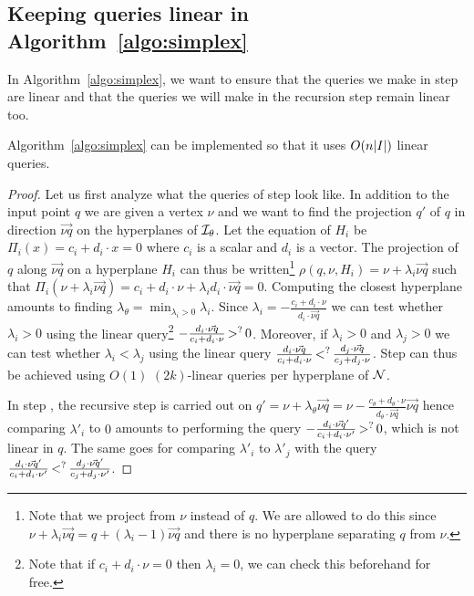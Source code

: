 \subsection{Keeping queries linear in Algorithm~\ref*{algo:simplex}}
\label{app:keeplinear}
In Algorithm~\ref{algo:simplex}, we want to ensure that the queries we make in step
 are linear and that the queries we will make in the recursion step
remain linear too.
\begin{lemma}
	Algorithm~\ref{algo:simplex} can be implemented so that it uses $O(n|{I}|)$ linear queries.
\end{lemma}%
\begin{proof}
Let us first analyze what the queries of step  look like. In addition
to the input point \(q\) we are given a vertex \(\nu\) and we want to find the
projection \(q'\) of \(q\) in direction \(\vec{\nu q}\) on the hyperplanes of
\(\mathcal{I}_{\theta}\). Let the equation of \(H_{i}\) be \(\Pi_{i}(x) =
c_{i} + d_{i}
\cdot x = 0\) where \(c_{i}\) is a scalar and \(d_{i}\) is a
vector.
The projection of \(q\) along \(\vec{\nu q}\) on a hyperplane \(H_i\) can thus
be written\footnote{Note that we project from \(\nu\) instead of \(q\). We are
allowed to do this since \(\nu + \lambda_{i} \vec{\nu q} = q + (\lambda_i - 1)
\vec{\nu q}\) and there is no hyperplane
separating \(q\) from \(\nu\).}
\(\rho(q,\nu,H_i) = \nu + \lambda_{i} \vec{\nu q}\) such that \(\Pi_{i}(\nu +
		\lambda_{i} \vec{\nu q}) = c_{i} + d_{i} \cdot \nu +
		\lambda_{i} d_{i} \cdot
\vec{\nu q} = 0\). Computing the closest hyperplane amounts to finding
\(\lambda_{\theta} = \min_{\lambda_i > 0} \lambda_i\). Since \(\lambda_i = -
\frac{c_i + d_i \cdot \nu}{d_i \cdot \vec{\nu q}}\) we can test whether
\(\lambda_i > 0\)
using the linear query\footnote{Note that if $c_i + d_i \cdot \nu = 0$ then
$\lambda_i=0$, we can check this beforehand for free.}
\(-\frac{d_i \cdot \vec{\nu q}}{c_i + d_i
\cdot \nu} \mathop{>}^{?} 0\). Moreover, if \(\lambda_i > 0\) and \(\lambda_j > 0\)
we can test whether $\lambda_i < \lambda_j$ using the linear query \(
\frac{d_i \cdot \vec{\nu q}}{c_i + d_i \cdot \nu}
\mathop{<}^{?}
\frac{d_j \cdot \vec{\nu q}}{c_j + d_j \cdot \nu}\).
Step  can thus be achieved using \(O(1)\) \((2k)\)-linear queries per
hyperplane of \(\mathcal{N}\).

In step , the
recursive step is carried out on \(q' = \nu + \lambda_{\theta} \vec{\nu q} = \nu -
\frac{c_{\theta} + d_{\theta} \cdot \nu}{d_{\theta} \cdot \vec{\nu q}}
\vec{\nu q}\) hence comparing \(\lambda'_i\) to \(0\) amounts to performing the
query \(-\frac{d_i \cdot \vec{\nu q}'}{c_i + d_i \cdot \nu'}
\mathop{>}^{?} 0\), which is not linear in \(q\). The same goes for comparing
\(\lambda'_i\) to \(\lambda'_j\) with the query
\(\frac{d_i \cdot \vec{\nu q}'}{c_i + d_i \cdot \nu'}
\mathop{<}^{?}
\frac{d_j \cdot \vec{\nu q}'}{c_j + d_j \cdot \nu'}\).


\end{proof}
